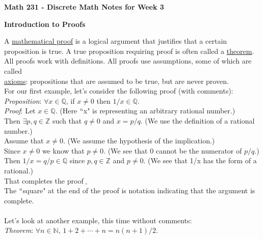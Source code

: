 \documentclass[12pt]{amsart}
\theoremstyle{definition}
\theoremstyle{remark}
\newcommand{\nats}{\mathbb N}
\newcommand{\ints}{\mathbb Z}
\newcommand{\rats}{\mathbb Q}
\begin{document}
\textbf{Math 231 - Discrete Math \hfill{} Notes for Week 3}

\bigskip
\bigskip

\textbf{Introduction to Proofs}


\bigskip

A \underline{mathematical proof} is a logical argument that justifies that a certain proposition is true.  A true proposition requiring proof is often called a \underline{theorem}. \\

 All proofs work with definitions.  All proofs use assumptions, some of which are called\\ \underline{axioms}:  propositions that are assumed to be true, but are never proven.\\

For our first example, let's consider the following proof (with comments):\\


\emph{Proposition}:  $\forall x\in\rats$, if $x\neq 0$ then $1/x\in\rats$.  \\

\emph{Proof}:  Let $x\in\rats$.  (Here $``$x" is representing an arbitrary rational number.)\\

Then $\exists p,q\in\ints$ such that $q\neq 0$ and $x=p/q$.  (We use the definition of a rational number.)\\

Assume that $x\neq 0$.  (We assume the hypothesis of the implication.)\\

Since $x\neq 0$ we know that $p\neq 0$.  (We see that $0$ cannot be the numerator of $p/q$.)\\

Then $1/x=q/p\in\rats$ since $p,q\in \ints$ and $p\neq 0$.  (We see that 1/x has the form of a rational.)  \\

That completes the proof$\;_{\square}$\\

The $``$square" at the end of the proof is notation indicating that the argument is complete.\\ \\

Let's look at another example, this time without comments:\\

\emph{Theorem}:  $\forall n\in\nats$, $1+2+\cdots +n=n(n+1)/2$.
\end{document}
